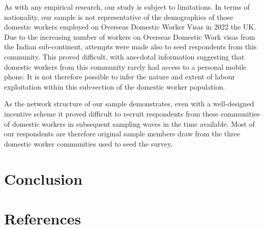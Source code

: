 \documentclass[
  12pt,
]{article}
\theoremstyle{plain}
\theoremstyle{definition}
\begin{document}
As with any empirical research, our study is subject to limitations. In
terms of nationality, our sample is not representative of the
demographics of those domestic workers employed on Overseas Domestic
Worker Visas in 2022 the UK. Due to the increasing number of workers on
Overseas Domestic Work visas from the Indian sub-continent, attempts
were made also to seed respondents from this community. This proved
difficult, with anecdotal information suggesting that domestic workers
from this community rarely had access to a personal mobile phone. It is
not therefore possible to infer the nature and extent of labour
exploitation within this sub-section of the domestic worker population.

As the network structure of our sample demonstrates, even with a
well-designed incentive scheme it proved difficult to recruit
respondents from these communities of domestic workers in subsequent
sampling waves in the time available. Most of our respondents are
therefore original sample members draw from the three domestic worker
communities used to seed the survey.

\section{Conclusion}\label{conclusion}

\newpage

\newpage

\section{References}\label{references}
\end{document}
